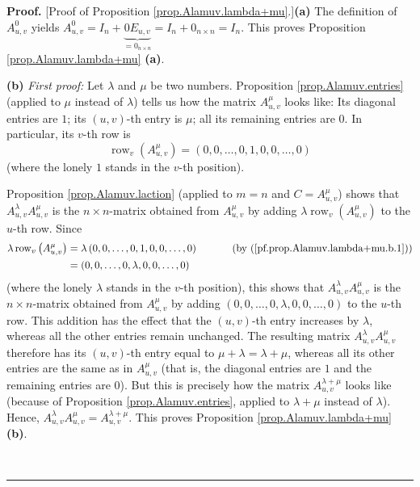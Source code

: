 \documentclass[numbers=enddot,12pt,final,onecolumn,notitlepage]{scrartcl}%
\theoremstyle{definition}
\newenvironment{proof}[1][Proof]{\noindent\textbf{#1.} }{\ \rule{0.5em}{0.5em}}
\begin{document}
\begin{proof}
[Proof of Proposition \ref{prop.Alamuv.lambda+mu}.]\textbf{(a)} The definition
of $A_{u,v}^{0}$ yields $A_{u,v}^{0}=I_{n}+\underbrace{0E_{u,v}}_{=0_{n\times
n}}=I_{n}+0_{n\times n}=I_{n}$. This proves Proposition
\ref{prop.Alamuv.lambda+mu} \textbf{(a)}.

\textbf{(b)} \textit{First proof:} Let $\lambda$ and $\mu$ be two numbers.
Proposition \ref{prop.Alamuv.entries} (applied to $\mu$ instead of $\lambda$)
tells us how the matrix $A_{u,v}^{\mu}$ looks like: Its diagonal entries are
$1$; its $\left(  u,v\right)  $-th entry is $\mu$; all its remaining entries
are $0$. In particular, its $v$-th row is%
\begin{equation}
\operatorname*{row}\nolimits_{v}\left(  A_{u,v}^{\mu}\right)  =\left(
0,0,\ldots,0,1,0,0,\ldots,0\right)  \label{pf.prop.Alamuv.lambda+mu.b.1}%
\end{equation}
(where the lonely $1$ stands in the $v$-th position).

Proposition \ref{prop.Alamuv.laction} (applied to $m=n$ and $C=A_{u,v}^{\mu}$)
shows that $A_{u,v}^{\lambda}A_{u,v}^{\mu}$ is the $n\times n$-matrix obtained
from $A_{u,v}^{\mu}$ by adding $\lambda\operatorname*{row}\nolimits_{v}\left(
A_{u,v}^{\mu}\right)  $ to the $u$-th row. Since
\begin{align*}
\lambda\operatorname*{row}\nolimits_{v}\left(  A_{u,v}^{\mu}\right)   &
=\lambda\left(  0,0,\ldots,0,1,0,0,\ldots,0\right)
\ \ \ \ \ \ \ \ \ \ \left(  \text{by (\ref{pf.prop.Alamuv.lambda+mu.b.1}%
)}\right) \\
&  =\left(  0,0,\ldots,0,\lambda,0,0,\ldots,0\right)
\end{align*}
(where the lonely $\lambda$ stands in the $v$-th position), this shows that
$A_{u,v}^{\lambda}A_{u,v}^{\mu}$ is the $n\times n$-matrix obtained from
$A_{u,v}^{\mu}$ by adding $\left(  0,0,\ldots,0,\lambda,0,0,\ldots,0\right)  $
to the $u$-th row. This addition has the effect that the $\left(  u,v\right)
$-th entry increases by $\lambda$, whereas all the other entries remain
unchanged. The resulting matrix $A_{u,v}^{\lambda}A_{u,v}^{\mu}$ therefore has
its $\left(  u,v\right)  $-th entry equal to $\mu+\lambda=\lambda+\mu$,
whereas all its other entries are the same as in $A_{u,v}^{\mu}$ (that is, the
diagonal entries are $1$ and the remaining entries are $0$). But this is
precisely how the matrix $A_{u,v}^{\lambda+\mu}$ looks like (because of
Proposition \ref{prop.Alamuv.entries}, applied to $\lambda+\mu$ instead of
$\lambda$). Hence, $A_{u,v}^{\lambda}A_{u,v}^{\mu}=A_{u,v}^{\lambda+\mu}$.
This proves Proposition \ref{prop.Alamuv.lambda+mu} \textbf{(b)}.


\end{proof}
\end{document}
